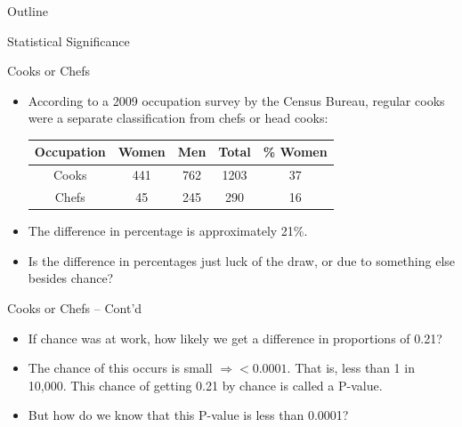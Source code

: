 \documentclass[14pt]{beamer}\usepackage[]{graphicx}\usepackage[]{color}
\begin{document}
\begin{frame}[fragile]{Outline}

Statistical Significance  

\end{frame}

\begin{frame}[fragile]{Cooks or Chefs}

\begin{itemize}
\item According to a 2009 occupation survey by the Census Bureau, regular cooks were a separate classification from chefs or head cooks:

\vspace{3mm}

\begin{tabular}{@{} ccccc @{}} \hline
Occupation & Women & Men & Total & \% Women \\ \hline
Cooks & 441 & 762 & 1203 & 37 \\
Chefs & 45  & 245 & 290  & 16 \\ \hline
\end{tabular}

\item The difference in percentage is approximately 21\%.
\item Is the difference in percentages just luck of the draw, or due to something  else besides chance?
\end{itemize}
\end{frame}

\begin{frame}[fragile]{Cooks or Chefs -- Cont'd}

\begin{itemize}
\item If chance was at work, how likely we get a difference in proportions of  0.21?
\item The chance of this occurs is small $\Rightarrow < 0.0001$. That is, less than 1 in 10,000.  This chance of getting 0.21 by chance is called a P-value.
\item But how do we know that this P-value is less than 0.0001?
\end{itemize}
\end{frame}
\end{document}
